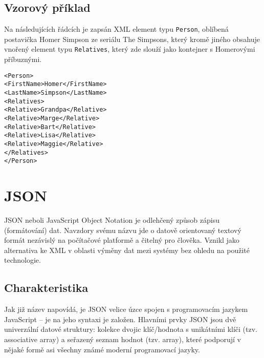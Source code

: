 \subsection{Vzorový příklad}
\label{xmlpriklad}
Na následujících řádcích je zapsán XML element typu \texttt{Person}, oblíbená postavička Homer Simpson ze seriálu The Simpsons, který kromě jiného obsahuje vnořený element typu \texttt{Relatives}, který zde slouží jako kontejner s Homerovými příbuznými.

\texttt{\small<Person>\\
\hspace*{2mm}<FirstName>Homer</FirstName>\\
\hspace*{2mm}<LastName>Simpson</LastName>\\
\hspace*{2mm}<Relatives>\\
\hspace*{4mm}<Relative>Grandpa</Relative>\\
\hspace*{4mm}<Relative>Marge</Relative>\\
\hspace*{4mm}<Relative>Bart</Relative>\\
\hspace*{4mm}<Relative>Lisa</Relative>\\
\hspace*{4mm}<Relative>Maggie</Relative>\\
\hspace*{2mm}</Relatives>\\
</Person>}

\section{JSON}
\label{sectionJson}
JSON neboli JavaScript Object Notation je odlehčený způsob zápisu (formátování) dat. Navzdory svému názvu jde o datově orientovaný textový formát nezávislý na počítačové platformě a čitelný pro člověka. Vznikl jako alternativa ke XML v oblasti výměny dat mezi systémy bez ohledu na použité technologie.

\subsection{Charakteristika}
Jak již název napovídá, je JSON velice úzce spojen s programovacím jazykem JavaScript -- je na jeho syntaxi je založen. Hlavními prvky JSON jsou dvě univerzální datové struktury: kolekce dvojic klíč/hodnota s unikátními klíči (tzv. associative array) a seřazený seznam hodnot (tzv. array), které podporují v nějaké formě asi všechny známé moderní programovací jazyky.

